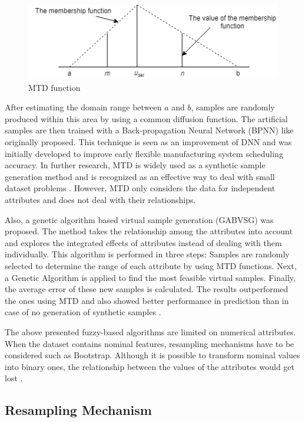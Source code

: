 \documentclass[parskip=full]{scrartcl}
\begin{document}
\begin{figure}[H]
	\centering
	\includegraphics[width=0.6\linewidth]{"../analysis/mtd_function"}
	\caption{MTD function \cite{Li.2007}}
	\label{fig:mtd-function}
\end{figure}

After estimating the domain range between $\mathit{a}$ and $\mathit{b}$, samples are randomly 
produced within this area by using a common diffusion function. The artificial samples are then trained 
with a Back-propagation Neural Network (BPNN) like \cite{Huang.2004} originally proposed. This 
technique is seen as an improvement of DNN and was initially developed to improve early flexible 
manufacturing system scheduling accuracy. In further research, MTD is widely used as a synthetic 
sample generation method and is recognized as an effective way to deal with small dataset problems 
\cite{AbdulLateh.2017}. However, MTD only considers the data for independent attributes and does not 
deal with their relationships. 

Also, a genetic algorithm based virtual sample generation (GABVSG) was proposed. The method takes 
the relationship among the attributes into account and explores the integrated effects of attributes 
instead of dealing with them individually. This algorithm is performed in three steps: Samples are 
randomly selected to determine the range of each attribute by using MTD functions. Next, a Genetic 
Algorithm is applied to find the most feasible virtual samples. Finally, the average error of these new 
samples is calculated. The results outperformed the ones using MTD and also showed better 
performance in prediction than in case of no generation of synthetic samples \cite{Li.2014}.

The above presented fuzzy-based algorithms are limited on numerical attributes. When the dataset 
contains nominal features, resampling mechanisms have to be considered such as Bootstrap. Although 
it is possible to transform nominal values into binary ones, the relationship between the values of the 
attributes would get lost \cite{Tsai.2008}. 

\subsection{Resampling Mechanism}
\end{document}
